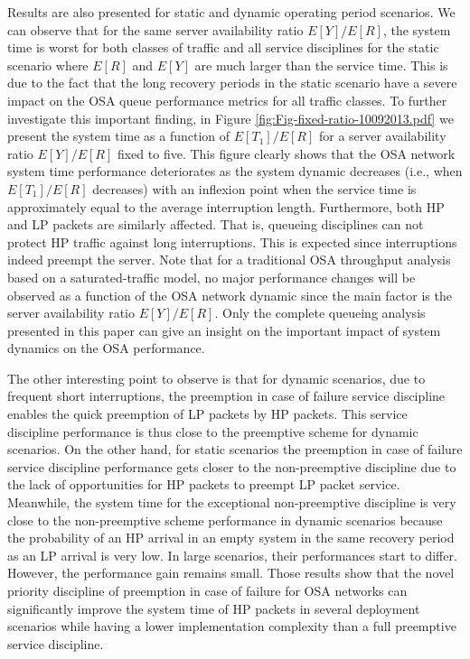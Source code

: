 \documentclass[11pt,journal,oneside,onecolumn,draftclsnofoot]{IEEEtran}
\begin{document}
Results are also presented for static and dynamic operating period scenarios.  We can observe that for the same server availability ratio $E[Y]/E[R]$, the system time is worst for both classes of traffic and all service disciplines for the static scenario where $E[R]$ and $E[Y]$ are much larger than the service time. This is due to the fact that the long recovery periods in the static scenario have a severe impact on the OSA queue performance metrics for all traffic classes. To further investigate this important finding, in Figure \ref{fig:Fig-fixed-ratio-10092013.pdf} we present the system time as a function of ${E[T_1]}/{E[R]}$ for a server availability ratio $E[Y]/E[R]$  fixed to five.  This figure clearly shows that the OSA network system time performance deteriorates as the system dynamic decreases (i.e., when ${E[T_1]}/{E[R]}$ decreases) with an inflexion point when the service time is approximately equal to the average interruption length. Furthermore, both HP and LP packets are similarly affected. That is, queueing disciplines can not protect HP traffic against long interruptions. This is expected since interruptions indeed preempt the server. Note that for a traditional OSA throughput analysis based on a saturated-traffic model, no major performance changes will be observed as a function of the OSA network dynamic since the main factor is the server availability ratio $E[Y]/E[R]$. Only the complete queueing analysis presented in this paper can give an insight on the important impact of system dynamics on the OSA performance.

The other interesting point to observe is that for dynamic scenarios, due to frequent short interruptions, the preemption in case of failure service discipline enables the quick preemption of LP packets by HP packets. This service discipline performance is thus close to the preemptive scheme for dynamic scenarios. On the other hand, for static scenarios the preemption in case of failure service discipline performance gets closer to the non-preemptive discipline due to the lack of opportunities for HP packets to preempt LP packet service. 
Meanwhile, the system time for the exceptional non-preemptive discipline is very close to the non-preemptive scheme performance in dynamic scenarios because the probability of an HP arrival in an empty system in the same recovery period as an LP arrival is very low. In large scenarios, their performances start to differ. However, the performance gain remains small. Those results show that the novel priority discipline of preemption in case of failure for OSA networks can significantly improve the system time of HP packets in several deployment scenarios while having a lower implementation complexity than a full preemptive service discipline.
\end{document}
